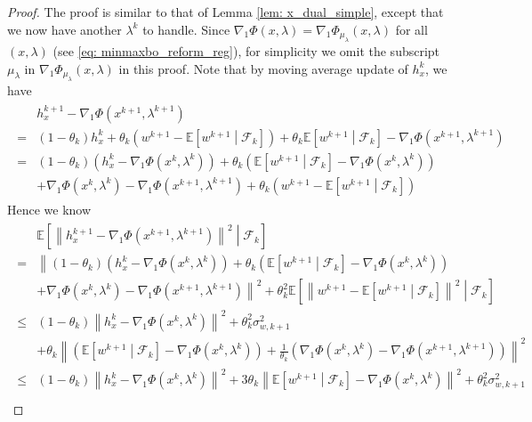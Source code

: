 \documentclass[10pt]{article}
\theoremstyle{remark}
\def\setF{\mathscr{F}} %
\newcommand{\E}{\mathbb{E}}
\newcommand{\norm}[1]{\left\|#1\right\|}
\begin{document}
\begin{proof}
    The proof is similar to that of Lemma \ref{lem: x_dual_simple}, except that we now have another $\lambda^k$ to handle. Since $\nabla_1\Phi(x,\lambda) = \nabla_1\Phi_{\mu_{\lambda}}(x,\lambda)$ for all $(x,\lambda)$ (see \eqref{eq: minmaxbo_reform_reg}), for simplicity we omit the subscript $\mu_{\lambda}$ in $\nabla_1\Phi_{\mu_{\lambda}}(x,\lambda)$ in this proof. Note that by moving average update of $h_x^k$, we have
\begin{align}
    \begin{aligned}
        &h_x^{k+1} - \nabla_1\Phi(x^{k+1}, \lambda^{k+1}) \\
        = &(1 - \theta_k)h_x^k + \theta_k(w^{k+1} - \E\left[w^{k+1}\middle|\setF_k\right]) + \theta_k\E\left[w^{k+1}\middle|\setF_k\right] - \nabla_1\Phi(x^{k+1}, \lambda^{k+1})\\
        = &(1 - \theta_k)(h_x^k - \nabla_1\Phi(x^k, \lambda^k)) + \theta_k(\E\left[w^{k+1}\middle|\setF_k\right] - \nabla_1\Phi(x^k, \lambda^k)) \\
        & + \nabla_1\Phi(x^k, \lambda^k) - \nabla_1\Phi(x^{k+1}, \lambda^{k+1})  + \theta_k(w^{k+1} - \E\left[w^{k+1}\middle|\setF_k\right])
    \end{aligned}
\end{align}
Hence we know 
\begin{align}\label{ineq: h_x_decrease}
    \begin{aligned}
        &\E\left[\norm{h_x^{k+1} - \nabla_1\Phi(x^{k+1}, \lambda^{k+1})}^2\middle|\setF_k\right] \\
        = &\left\| (1 - \theta_k)(h_x^k - \nabla_1\Phi(x^k, \lambda^k)) + \theta_k(\E\left[w^{k+1}\middle|\setF_k\right] - \nabla_1\Phi(x^k, \lambda^k)) \right. \\
        & + \left. \nabla_1\Phi(x^k, \lambda^k) - \nabla_1\Phi(x^{k+1}, \lambda^{k+1})\right\|^2+ \theta_k^2\E\left[\norm{w^{k+1} - \E\left[w^{k+1}\middle|\setF_k\right]}^2\middle|\setF_k\right]\\ 
        \leq &(1 - \theta_k)\norm{h_x^k - \nabla_1\Phi(x^k, \lambda^k)}^2 +\theta_k^2\sigma_{w,k+1}^2 \\
        & + \theta_k\norm{(\E\left[w^{k+1}\middle|\setF_k\right] - \nabla_1\Phi(x^k, \lambda^k)) + \frac{1}{\theta_k}(\nabla_1\Phi(x^k, \lambda^k) - \nabla_1\Phi(x^{k+1}, \lambda^{k+1}))}^2 \\
        \leq &(1 - \theta_k)\norm{h_x^k - \nabla_1\Phi(x^k, \lambda^k)}^2 + 3\theta_k\norm{\E\left[w^{k+1}\middle|\setF_k\right] - \nabla_1\Phi(x^k, \lambda^k)}^2 +\theta_k^2\sigma_{w,k+1}^2 \\

\end{aligned}
\end{align}
\end{proof}
\end{document}
